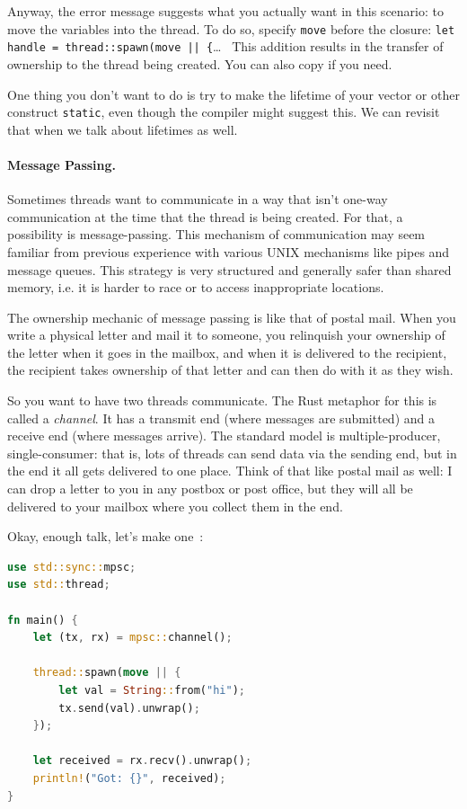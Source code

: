 \documentclass[a4paper]{report}
\begin{document}
Anyway, the error message suggests what you actually want in this scenario: to move the variables into the thread. To do so, specify \texttt{move} before the closure: \texttt{let handle = thread::spawn(move || \{}\ldots~ This addition results in the transfer of ownership to the thread being created. You can also copy if you need. 

One thing you don't want to do is try to make the lifetime of your vector or other construct \texttt{static}, even though the compiler might suggest this. We can revisit that when we talk about lifetimes as well.

\paragraph{Message Passing.} Sometimes threads want to communicate in a way that isn't one-way communication at the time that the thread is being created. For that, a possibility is message-passing. This mechanism of communication may seem familiar from previous experience with various UNIX mechanisms like pipes and message queues. This strategy is very structured and generally safer than shared memory, i.e. it is harder to race or to access inappropriate locations.

The ownership mechanic of message passing is like that of postal mail. When you write a physical letter and mail it to someone, you relinquish your ownership of the letter when it goes in the mailbox, and when it is delivered to the recipient, the recipient takes ownership of that letter and can then do with it as they wish.

So you want to have two threads communicate. The Rust metaphor for this is called a \textit{channel}. It has a transmit end (where messages are submitted) and a receive end (where messages arrive). The standard model is multiple-producer, single-consumer: that is, lots of threads can send data via the sending end, but in the end it all gets delivered to one place. Think of that like postal mail as well: I can drop a letter to you in any postbox or post office, but they will all be delivered to your mailbox where you collect them in the end.

Okay, enough talk, let's make one~\cite{rustdocs}:
\begin{lstlisting}[language=Rust]
use std::sync::mpsc;
use std::thread;

fn main() {
    let (tx, rx) = mpsc::channel();

    thread::spawn(move || {
        let val = String::from("hi");
        tx.send(val).unwrap();
    });

    let received = rx.recv().unwrap();
    println!("Got: {}", received);
}
\end{lstlisting}
\end{document}
